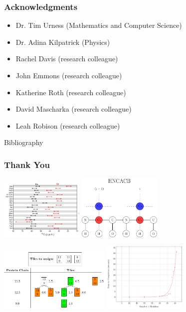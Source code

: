 \documentclass{beamer}
\begin{document}
\begin{frame}
	\frametitle{Acknowledgments}
	\begin{itemize}
		\item Dr. Tim Urness (Mathematics and Computer Science)
		\item Dr. Adina Kilpatrick (Physics)
		\item Rachel Davis (research colleague)
		\item John Emmons (research colleague)
		\item  Katherine Roth (research colleague)
		\item  David Mascharka (research colleague)
		\item  Leah Robison (research colleague)
	\end{itemize}
\end{frame}

\begin{frame}{Bibliography}


\end{frame}

\begin{frame}
	\frametitle{Thank You} 
	\begin{center}
	\includegraphics[width=0.3\textwidth]{carbon}\hspace{2em}
	\includegraphics[width=0.3\textwidth]{diagram}
	\end{center}
	\begin{center}
	\includegraphics[width=0.4\textwidth]{graphic/time_line}\hspace{2em}
	\includegraphics[width=0.3\textwidth]{plot}
\end{center}
\end{frame}
\end{document}

